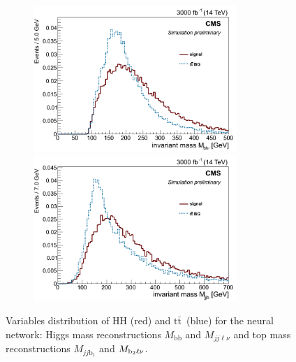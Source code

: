 \documentclass[10pt,a4paper]{article}
\newcommand{\ww}{7.7cm} %
\newcommand{\dd}{-2mm} %
\renewcommand{\b}{\text{b}}
\renewcommand{\tt}{\ensuremath{\text{t}\bar{\text{t}}}}
\newcommand{\lnu}{\ensuremath{\ell\nu}}
\begin{document}
\begin{figure}[h]
  \begin{subfigure}[b]{17cm}
    \begin{minipage}[h!]{\ww}
      \centering
      \includegraphics[width=\ww]{figs/M_blnu.png}
    \end{minipage}
    \begin{minipage}[h!]{\ww}
      \centering
      \includegraphics[width=\ww]{figs/M_jjb.png}
    \end{minipage}
    \hspace{9mm}
  \end{subfigure}	
  \vspace{\dd}
  \caption{Variables distribution of HH (red) and \tt\ (blue) for the neural network: Higgs mass reconstructions $M_{\b\b}$ and $M_{jj\ell\nu}$ and top mass reconstructions $M_{jj\text{b}_1}$ and $M_{\text{b}_2\text{\lnu}}$.} \label{vars7}

\end{figure}
\end{document}

